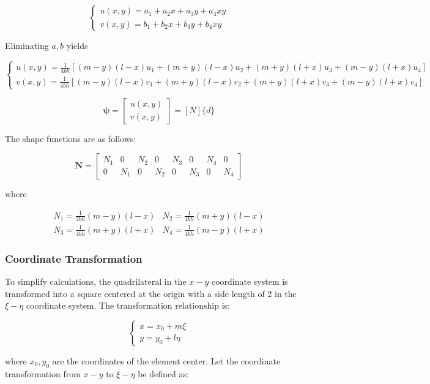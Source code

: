 \documentclass{article}
\begin{document}
\[
  \begin{cases}
    u(x, y) = a_1 + a_2 x + a_3 y + a_4 xy \\
    v(x, y) = b_1 + b_2 x + b_3 y + b_4 xy
  \end{cases}
\]

Eliminating \( a, b \) yields

\[
  \begin{cases}
    u(x, y) = \frac{1}{4bh} \left[ (m - y)(l - x)u_1 + (m + y)(l - x)u_2 + (m + y)(l + x)u_3 + (m - y)(l + x)u_4 \right] \\
    v(x, y) = \frac{1}{4bh} \left[ (m - y)(l - x)v_1 + (m + y)(l - x)v_2 + (m + y)(l + x)v_3 + (m - y)(l + x)v_4 \right]
  \end{cases}
\]

\[
  \mathbf{\psi} =
  \begin{bmatrix}
    u(x, y) \\
    v(x, y)
  \end{bmatrix} = [N] \{d\}
\]

The shape functions are as follows:

\[
  \mathbf{N} = \begin{bmatrix}
    N_1 & 0   & N_2 & 0   & N_3 & 0   & N_4 & 0   \\
    0   & N_1 & 0   & N_2 & 0   & N_3 & 0   & N_4
  \end{bmatrix}
\]

where

\[
  \begin{matrix}
    N_1 = \frac{1}{4bh} (m - y)(l - x) & N_2 = \frac{1}{4bh} (m + y)(l - x) \\
    N_3 = \frac{1}{4bh} (m + y)(l + x) & N_4 = \frac{1}{4bh} (m - y)(l + x)
  \end{matrix}
\]

\subsubsection{Coordinate Transformation}
To simplify calculations, the quadrilateral in the \( x-y \) coordinate system is transformed into a square centered at the origin with a side length of 2 in the \( \xi-\eta \) coordinate system. The transformation relationship is:

\[
  \begin{cases}
    x = x_0 + m \xi \\
    y = y_0 + l \eta
  \end{cases}
\]

where \( x_0, y_0 \) are the coordinates of the element center.
Let the coordinate transformation from \( x-y \) to \( \xi-\eta \) be defined as:
\end{document}
